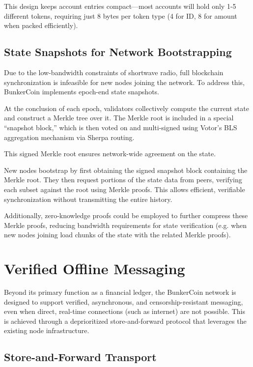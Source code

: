 \documentclass{article}
\begin{document}
This design keeps account entries compact—most accounts will hold only 1-5 different tokens, requiring just 8 bytes per token type (4 for ID, 8 for amount when packed efficiently).

\subsection{State Snapshots for Network Bootstrapping}

Due to the low-bandwidth constraints of shortwave radio, full blockchain synchronization is infeasible for new nodes joining the network. To address this, BunkerCoin implements epoch-end state snapshots.

At the conclusion of each epoch, validators collectively compute the current state and construct a Merkle tree over it. The Merkle root is included in a special ``snapshot block,'' which is then voted on and multi-signed using Votor's BLS aggregation mechanism via Sherpa routing.

This signed Merkle root ensures network-wide agreement on the state.

New nodes bootstrap by first obtaining the signed snapshot block containing the Merkle root. They then request portions of the state data from peers, verifying each subset against the root using Merkle proofs. This allows efficient, verifiable synchronization without transmitting the entire history.

Additionally, zero-knowledge proofs could be employed to further compress these Merkle proofs, reducing bandwidth requirements for state verification (e.g. when new nodes joining load chunks of the state with the related Merkle proofs).

\section{Verified Offline Messaging}
\label{sec:messaging}

Beyond its primary function as a financial ledger, the BunkerCoin network is designed to support verified, asynchronous, and censorship-resistant messaging, even when direct, real-time connections (such as internet) are not possible. This is achieved through a deprioritized store-and-forward protocol that leverages the existing node infrastructure.

\subsection{Store-and-Forward Transport}
\end{document}
